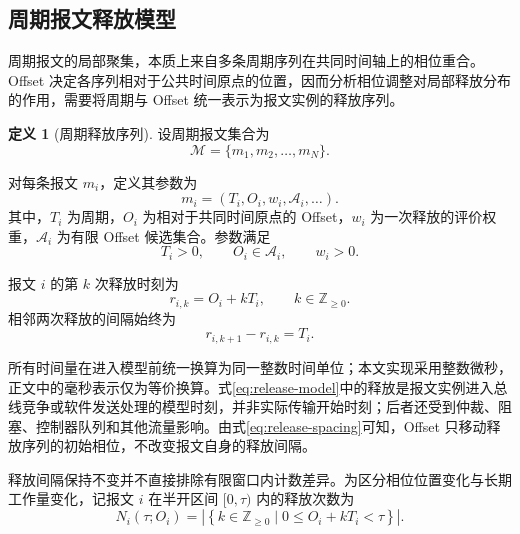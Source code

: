 \documentclass[UTF8,a4paper,twoside,zihao=-4]{ctexart}
\numberwithin{equation}{section}
\numberwithin{figure}{section}
\numberwithin{table}{section}
\theoremstyle{definition}
\newtheorem{definition}{定义}
\newcommand{\Oset}{\mathcal{A}}
\newcommand{\Mset}{\mathcal{M}}
\numberwithin{algocf}{section}
\begin{document}
\subsection{周期报文释放模型}

周期报文的局部聚集，本质上来自多条周期序列在共同时间轴上的相位重合。Offset 决定各序列相对于公共时间原点的位置，因而分析相位调整对局部释放分布的作用，需要将周期与 Offset 统一表示为报文实例的释放序列。

\begin{definition}[周期释放序列]
设周期报文集合为
\begin{equation}
 \Mset=\{m_1,m_2,\ldots,m_N\}.
\label{eq:message-set}
\end{equation}

对每条报文 $m_i$，定义其参数为
\begin{equation}
 m_i=(T_i,O_i,w_i,\Oset_i,\ldots).
\label{eq:message-parameters}
\end{equation}
其中，$T_i$ 为周期，$O_i$ 为相对于共同时间原点的 Offset，$w_i$ 为一次释放的评价权重，$\Oset_i$ 为有限 Offset 候选集合。参数满足
\begin{equation}
 T_i>0,\qquad O_i\in\Oset_i,\qquad w_i>0.
\label{eq:message-parameter-domain}
\end{equation}

报文 $i$ 的第 $k$ 次释放时刻为
\begin{equation}
 r_{i,k}=O_i+kT_i,\qquad k\in\mathbb Z_{\ge0}.
\label{eq:release-model}
\end{equation}
相邻两次释放的间隔始终为
\begin{equation}
 r_{i,k+1}-r_{i,k}=T_i.
\label{eq:release-spacing}
\end{equation}
\end{definition}

所有时间量在进入模型前统一换算为同一整数时间单位；本文实现采用整数微秒，正文中的毫秒表示仅为等价换算。式\eqref{eq:release-model}中的释放是报文实例进入总线竞争或软件发送处理的模型时刻，并非实际传输开始时刻；后者还受到仲裁、阻塞、控制器队列和其他流量影响。由式\eqref{eq:release-spacing}可知，Offset 只移动释放序列的初始相位，不改变报文自身的释放间隔。

释放间隔保持不变并不直接排除有限窗口内计数差异。为区分相位位置变化与长期工作量变化，记报文 $i$ 在半开区间 $[0,\tau)$ 内的释放次数为
\begin{equation}
 N_i(\tau;O_i)
 =\left|\left\{k\in\mathbb Z_{\ge0}\mid
 0\le O_i+kT_i<\tau\right\}\right|.
\label{eq:release-count-prefix}
\end{equation}
\end{document}
